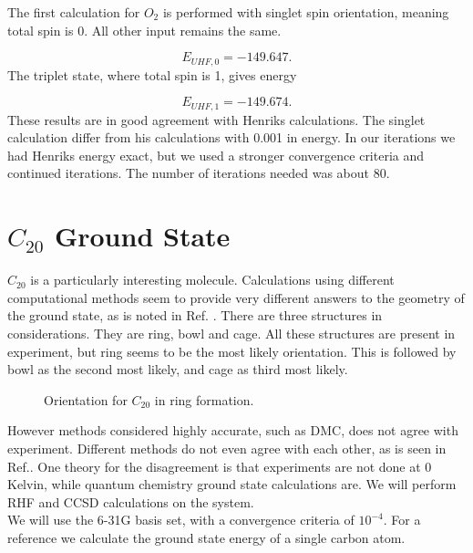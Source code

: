 \documentclass[a4paper,norsk,11pt,twoside]{report}
\begin{document}
The first calculation for $O_2$ is performed with singlet spin orientation, meaning total spin is 0. All other input remains the same. 

\begin{equation}
E_{UHF,0} = -149.647 .
\end{equation}
The triplet state, where total spin is 1, gives energy

\begin{equation}
E_{UHF,1} = -149.674  .
\end{equation}
These results are in good agreement with Henriks calculations. The singlet calculation differ from his calculations with 0.001 in energy. In our iterations we had Henriks energy exact, but we used a stronger convergence criteria and continued iterations. The number of iterations needed was about 80. 

\section{$C_{20}$ Ground State} 
$C_{20}$ is a particularly interesting molecule. Calculations using different computational methods seem to provide very different answers to the geometry of the ground state, as is noted in Ref. \cite{c20article_cite_this}. There are three structures in considerations. They are ring, bowl and cage. All these structures are present in experiment, but ring seems to be the most likely orientation. This is followed by bowl as the second most likely, and cage as third most likely.  \\

\begin{figure}[h!]
\begin{center}
\caption{Orientation for $C_{20}$ in ring formation.}
\label{fig:c20ring}
\end{center}
\end{figure}

However methods considered highly accurate, such as DMC, does not agree with experiment. Different methods do not even agree with each other, as is seen in Ref.\cite{c20coordinatesarticlezz}. One theory for the disagreement is that experiments are not done at 0 Kelvin, while quantum chemistry ground state calculations are. We will perform RHF and CCSD calculations on the system. \\

We will use the 6-31G basis set, with a convergence criteria of $10^{-4}$. For a reference we calculate the ground state energy of a single carbon atom.
\end{document}
